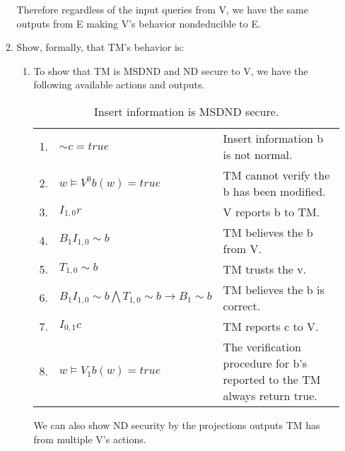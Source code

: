 \documentclass[journal,onecolumn]{IEEEtran}
\begin{document}
\begin{enumerate}
\begin{enumerate}
      Therefore regardless of the input queries from V, we have the same outputs from E making V's behavior nondeducible to E.

      \item Show, formally, that TM's behavior is:
      
      \begin{enumerate}
        \item To show that TM is MSDND and ND secure to V, we have the following available actions and outputs.
        
        \begin{table}[H]
          \caption{Insert information is MSDND secure.}
          \centering
          \begin{tabular}{lll}
          1.  & ${\sim} c = true$                                                         & Insert information b is not normal.                                                       \\
          2.  & $w \vDash V^0 b(w) = true$                                                & TM cannot verify the b has been modified.                                 \\
          3.  & $I_{1,0}r$                                                                & V reports b to TM.                                                \\
          4.  & $B_1I_{1,0} {\sim} b$                                                     & TM believes the b from V.                                     \\
          5.  & $T_{1,0} {\sim} b$                                                        & TM trusts the v.                                                          \\
          6.  & $B_1I_{1,0} {\sim} b \bigwedge T_{1,0} {\sim} b \rightarrow B_1 {\sim} b$ & TM believes the b is correct.                                             \\
          7.  & $I_{0,1}c$                                                                & TM reports c to V.           \\
          8. & $w \vDash V_1 b(w) = true$                                                 & The verification procedure for b's reported to the TM always return true.
          \end{tabular}
        \end{table}

        We can also show ND security by the projections outputs TM has from multiple V's actions.\\


\end{enumerate}
\end{enumerate}
\end{enumerate}
\end{document}
